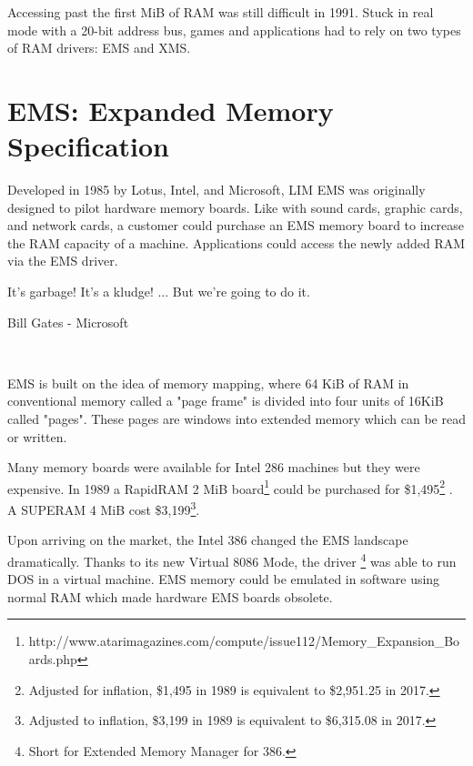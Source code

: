 \label{ems_vs_xms}
Accessing past the first MiB of RAM was still difficult in 1991. Stuck in real mode with a 20-bit address bus, games and applications had to rely on two types of RAM drivers: EMS and XMS.\\
\par

\section{EMS: Expanded Memory Specification}
Developed in 1985 by Lotus, Intel, and Microsoft, LIM EMS was originally designed to pilot hardware memory boards. Like with sound cards, graphic cards, and network cards, a customer could purchase an EMS memory board to increase the RAM capacity of a machine. Applications could access the newly added RAM via the EMS driver.\\
\par
\begin{fancyquotes}
It's garbage! It's a kludge! ... But we're going to do it.\\
\par
Bill Gates - Microsoft
\end{fancyquotes}\\
\par
 EMS is built on the idea of memory mapping, where 64 KiB of RAM in conventional memory called a "page frame" is divided into four units of 16KiB called "pages". These pages are windows into extended memory which can be read or written.\\
\par


Many memory boards were available for Intel 286 machines but they were expensive. In 1989 a RapidRAM 2 MiB board\footnote{http://www.atarimagazines.com/compute/issue112/Memory\_Expansion\_Boards.php} could be purchased for \$1,495\footnote{Adjusted for inflation, \$1,495 in 1989 is equivalent to \$2,951.25 in 2017.} . A SUPERAM 4 MiB cost \$3,199\footnote{Adjusted to inflation, \$3,199 in 1989 is equivalent to \$6,315.08 in 2017.}.\\
\par
Upon arriving on the market, the Intel 386 changed the EMS landscape dramatically. Thanks to its new Virtual 8086 Mode, the driver \footnote{Short for Extended Memory Manager for 386.} was able to run DOS in a virtual machine. EMS memory could be emulated in software using normal RAM which made hardware EMS boards  obsolete.\\



